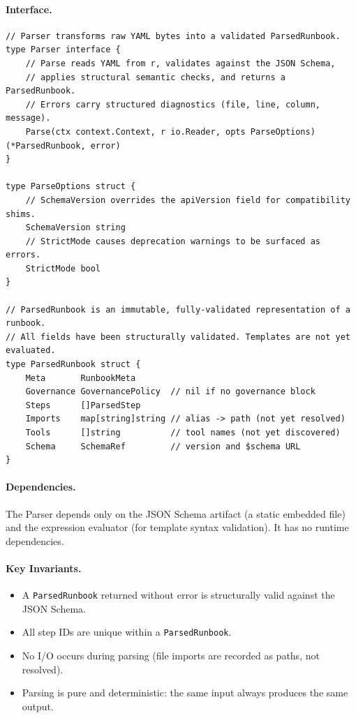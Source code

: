 \paragraph{Interface.}

\begin{verbatim}
// Parser transforms raw YAML bytes into a validated ParsedRunbook.
type Parser interface {
    // Parse reads YAML from r, validates against the JSON Schema,
    // applies structural semantic checks, and returns a ParsedRunbook.
    // Errors carry structured diagnostics (file, line, column, message).
    Parse(ctx context.Context, r io.Reader, opts ParseOptions) (*ParsedRunbook, error)
}

type ParseOptions struct {
    // SchemaVersion overrides the apiVersion field for compatibility shims.
    SchemaVersion string
    // StrictMode causes deprecation warnings to be surfaced as errors.
    StrictMode bool
}

// ParsedRunbook is an immutable, fully-validated representation of a runbook.
// All fields have been structurally validated. Templates are not yet evaluated.
type ParsedRunbook struct {
    Meta       RunbookMeta
    Governance GovernancePolicy  // nil if no governance block
    Steps      []ParsedStep
    Imports    map[string]string // alias -> path (not yet resolved)
    Tools      []string          // tool names (not yet discovered)
    Schema     SchemaRef         // version and $schema URL
}
\end{verbatim}

\paragraph{Dependencies.}
The Parser depends only on the JSON Schema artifact (a static embedded file) and the expression
evaluator (for template syntax validation). It has no runtime dependencies.

\paragraph{Key Invariants.}
\begin{itemize}
  \item A \texttt{ParsedRunbook} returned without error is structurally valid against the JSON Schema.
  \item All step IDs are unique within a \texttt{ParsedRunbook}.
  \item No I/O occurs during parsing (file imports are recorded as paths, not resolved).
  \item Parsing is pure and deterministic: the same input always produces the same output.
\end{itemize}


